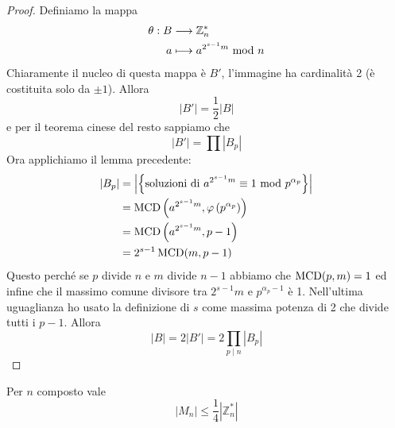 \begin{proof}
	Definiamo la mappa 
	\begin{align*}
	\theta:B&\longrightarrow \mathbb{Z}_n^*\\
	a&\longmapsto a^{2^{s-1}m}\ \mathrm{mod}\ n
	\end{align*}
	Chiaramente il nucleo di questa mappa è $B'$, l'immagine ha cardinalità 2 (è costituita solo da $\pm1$). Allora 
	\begin{equation*}
	\left|B'\right|=\frac{1}{2}\left|B\right|
	\end{equation*}
	e per il teorema cinese del resto sappiamo che
	\begin{equation*}
	\left|B'\right|=\prod\left|B_p\right|
	\end{equation*}
	Ora applichiamo il lemma precedente:
	\begin{align*}
	\left|B_p\right|
	&=\left|\left\{\text{soluzioni di} \ a^{2^{s-1}m}\equiv1\ \mathrm{mod}\ p^{\alpha_p}\right\}\right|\\
	&=\operatorname{\mathrm{MCD}}\left(a^{2^{s-1}m},\varphi\left(p^{\alpha_p}\right)\right)\\
	&=\operatorname{\mathrm{MCD}}\left(a^{2^{s-1}m},p-1\right)\\
	&=2^{s-1}\operatorname{\mathrm{MCD}}(m,p-1)
	\end{align*}
	Questo perché se $p$ divide $n$ e $m$ divide $n-1$ abbiamo che $\operatorname{\mathrm{MCD}}(p,m)=1$ ed infine che il massimo comune divisore tra $2^{s-1}m$ e $p^{\alpha_p-1}$ è 1. Nell'ultima uguaglianza ho usato la definizione di $s$ come massima potenza di 2 che divide tutti i $p-1$. Allora 
	\begin{equation*}
	\left|B\right|=2\left|B'\right|=2\prod_{p\mid n}\left|B_p\right|
	\end{equation*}
\end{proof}
\begin{teorema}
	Per $n$ composto vale 
	\begin{equation*}
	\left|M_n\right|\leq\frac{1}{4}\left|\mathbb{Z}_n^*\right|
	\end{equation*}
\end{teorema}
